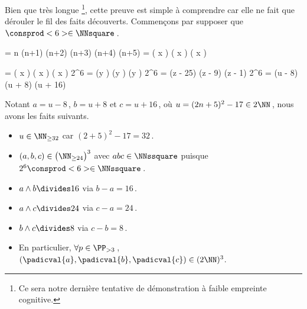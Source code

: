 Bien que très longue
\footnote{
	Ce sera notre dernière tentative de démonstration à faible empreinte cognitive.
},
cette preuve est simple à comprendre car elle ne fait que dérouler le fil des faits découverts.
Commençons par supposer que $\consprod<6> \in \NNsquare$\,.

\medskip
\begin{stepcalc}[style = ar*, ope = \iff]
	 = 
		n (n+1) (n+2) (n+3) (n+4) (n+5)
	\consprod<6> = 
		\big( x \pm {} \big) \big( x \pm {} \big) \big( x \pm {} \big)
\end{stepcalc}

\begin{stepcalc}[style = ar*, ope = \iff]
	 = 
		\big( x \pm {} \big) \big( x \pm {} \big) \big( x \pm {} \big)
	2^6 \consprod<6> = 
		(y ) (y ) (y )
%
	2^6 \consprod<6> = 
		(z - 25) (z - 9) (z - 1) 
	2^6 \consprod<6> = 
		(u - 8) (u + 8) (u + 16)
\end{stepcalc}

\medskip
Notant $a = u - 8$\,, $b = u + 8$ et $c = u + 16$\,, où $u = (2 n + 5)^2 - 17 \in 2 \NN$\,, nous avons les faits suivants.

\begin{itemize}
	\item $u \in \NN_{\geq 32}$ car $(2 + 5)^2 - 17 = 32$\,.

	\item $(a, b, c) \in \big( \NN_{\geq 24} \big)^3$ avec $abc \in \NNssquare$ puisque $2^6 \consprod<6> \in \NNssquare$\,.

	\item $a \wedge b \divides 16$ via $b - a = 16$\,.

	\item $a \wedge c \divides 24$ via $c - a = 24$\,.

	\item $b \wedge c \divides 8$  via $c - b = 8$\,.

	\item En particulier, 
	$\forall p \in \PP_{>3}$\,, 
	$(\padicval{a}, \padicval{b}, \padicval{c}) \in ( 2 \NN )^3$.
\end{itemize}

